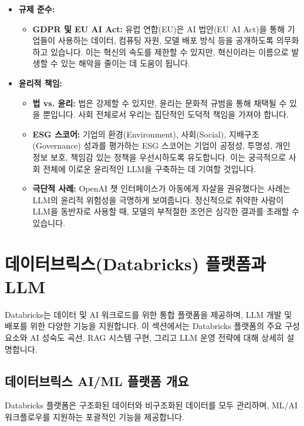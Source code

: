 \documentclass[11pt,a4paper]{article}
\theoremstyle{definition}
\begin{document}
\begin{itemize}
    \item \textbf{규제 준수:}
    \begin{itemize}
        \item \textbf{GDPR 및 EU AI Act:} 유럽 연합(EU)은 AI 법안(EU AI Act)을 통해 기업들이 사용하는 데이터, 컴퓨팅 자원, 모델 배포 방식 등을 공개하도록 의무화하고 있습니다. 이는 혁신의 속도를 제한할 수 있지만, 혁신이라는 이름으로 발생할 수 있는 해악을 줄이는 데 도움이 됩니다.
    \end{itemize}

    \item \textbf{윤리적 책임:}
    \begin{itemize}
        \item \textbf{법 vs. 윤리:} 법은 강제할 수 있지만, 윤리는 문화적 규범을 통해 채택될 수 있을 뿐입니다. 사회 전체로서 우리는 집단적인 도덕적 책임을 가져야 합니다.
        \item \textbf{ESG 스코어:} 기업의 환경(Environment), 사회(Social), 지배구조(Governance) 성과를 평가하는 ESG 스코어는 기업이 공정성, 투명성, 개인 정보 보호, 책임감 있는 정책을 우선시하도록 유도합니다. 이는 궁극적으로 사회 전체에 이로운 윤리적인 LLM을 구축하는 데 기여할 것입니다.
        \item \textbf{극단적 사례:} OpenAI 챗 인터페이스가 아동에게 자살을 권유했다는 사례는 LLM의 윤리적 위험성을 극명하게 보여줍니다. 정신적으로 취약한 사람이 LLM을 동반자로 사용할 때, 모델의 부적절한 조언은 심각한 결과를 초래할 수 있습니다.
    \end{itemize}
\end{itemize}

\newpage
\section{데이터브릭스(Databricks) 플랫폼과 LLM}

Databricks는 데이터 및 AI 워크로드를 위한 통합 플랫폼을 제공하며, LLM 개발 및 배포를 위한 다양한 기능을 지원합니다. 이 섹션에서는 Databricks 플랫폼의 주요 구성 요소와 AI 성숙도 곡선, RAG 시스템 구현, 그리고 LLM 운영 전략에 대해 상세히 설명합니다.

\subsection{데이터브릭스 AI/ML 플랫폼 개요}

Databricks 플랫폼은 구조화된 데이터와 비구조화된 데이터를 모두 관리하며, ML/AI 워크플로우를 지원하는 포괄적인 기능을 제공합니다.
\end{document}
